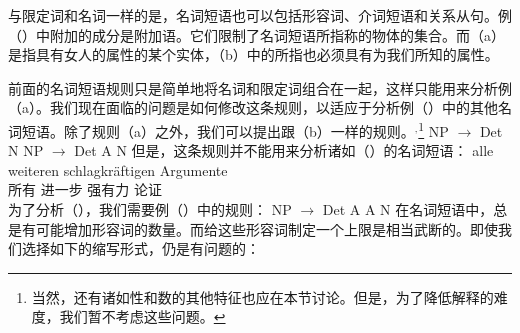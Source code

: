 \noindent
与限定词和名词一样的是，名词短语也可以包括形容词、介词短语和关系从句。例（）中附加的成分是附加语。它们限制了名词短语所指称的物体的集合。而（a）是指具有女人的属性的某个实体，（b）中的所指也必须具有为我们所知的属性。

前面的名词短语规则只是简单地将名词和限定词组合在一起，这样只能用来分析例（a）。我们现在面临的问题是如何修改这条规则，以适应于分析例（）中的其他名词短语。除了规则（a）之外，我们可以提出跟（b）一样的规则。$^,$\footnote{%
当然，还有诸如性和数的其他特征也应在本节讨论。但是，为了降低解释的难度，我们暂不考虑这些问题。
}
\eal
\ex NP $\to$ Det N
\ex NP $\to$ Det A N
\zl
但是，这条规则并不能用来分析诸如（）的名词短语：
\ea
\label{Beispiel-alle-weitern-schlagkraeftigen-Argumente}
\gll alle weiteren schlagkräftigen Argumente\\
	 所有 进一步 强有力 论证\\
\z
为了分析（），我们需要例（）中的规则：
\ea 
NP $\to$ Det A A N
\z
在名词短语中，总是有可能增加形容词的数量。而给这些形容词制定一个上限是相当武断的。即使我们选择如下的缩写形式，仍是有问题的：

